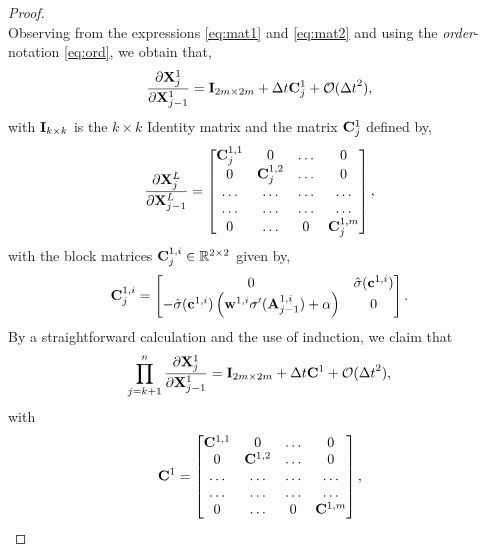 \documentclass{article}
\newcommand{\bw}{{\bf w}}
\newcommand{\bA}{{\bf A}}
\newcommand{\bX}{{\bf X}}
\newcommand{\bC}{{\bf C}}
\newcommand{\bc}{{\bf c}}
\newcommand{\ord}{{\mathcal O}}
\newcommand{\R}{{\mathbb R}}
\newcommand{\Dt}{{\Delta t}}
\begin{document}
\begin{proof}
\begin{equation}
\end{equation}
Observing from the expressions \eqref{eq:mat1} and \eqref{eq:mat2} and using the \emph{order}-notation \eqref{eq:ord}, we obtain that,
\begin{equation}
    \label{eq:p44}
\frac{\partial \bX^1_j}{\partial \bX^1_{j-1}} = {\bf I}_{2m \times 2m} + \Dt \bC^1_{j} + \ord(\Dt^2),     
\end{equation}
with ${\bf I}_{k \times k}$ is the $k \times k$ Identity matrix and the matrix $\bC^1_j$ defined by,
\begin{equation}
    \label{eq:p45}
    \frac{\partial \bX^L_j}{\partial \bX^L_{j-1}}= \begin{bmatrix}
    \bC^{1,1}_{j} &0 &\ldots &0 \\
    0&  \bC^{1,2}_{j} &\ldots &0 \\
    \ldots & \ldots & \ldots & \ldots \\
     \ldots & \ldots & \ldots & \ldots \\
     0 &\ldots & 0 &  \bC^{1,m}_{j}
    \end{bmatrix},
\end{equation}
with the block matrices $\bC^{1,i}_j \in \R^{2 \times 2}$ given by,
\begin{equation}
    \label{eq:p46}
    \bC^{1,i}_j  = \begin{bmatrix}
    0 & \hat{\sigma}(\bc^{1,i})  \\
    -\hat{\sigma}(\bc^{1,i})  \left(\bw^{1,i} \sigma^{\prime}(\bA^{1,i}_{j-1})+\alpha\right) & 0 
    \end{bmatrix}.
\end{equation}
By a straightforward calculation and the use of induction, we claim that 
\begin{equation}
    \label{eq:p47}
    \prod\limits_{j=k+1}^n  \frac{\partial \bX^1_j}{\partial \bX^1_{j-1}} = {\bf I}_{2m \times 2m} + \Dt \bC^1 + \ord(\Dt^2),  
\end{equation}
with 
\begin{equation}
    \label{eq:p48}
    \bC^1= \begin{bmatrix}
    \bC^{1,1} &0 &\ldots &0 \\
    0&  \bC^{1,2} &\ldots &0 \\
    \ldots & \ldots & \ldots & \ldots \\
     \ldots & \ldots & \ldots & \ldots \\
     0 &\ldots & 0 &  \bC^{1,m}
    \end{bmatrix},
\end{equation}

\end{proof}
\end{document}
